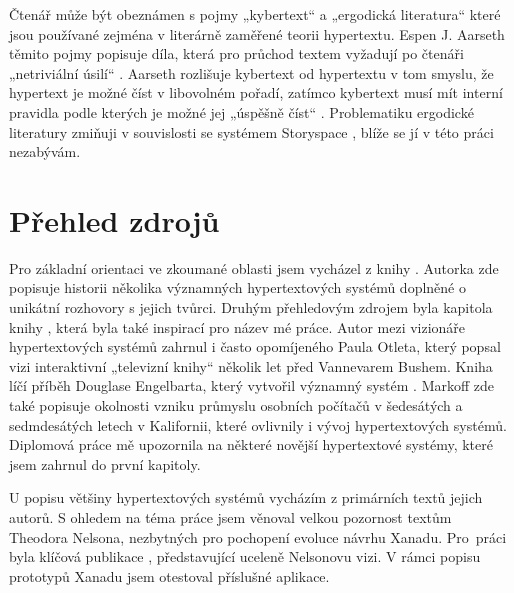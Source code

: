
Čtenář může být obeznámen s pojmy „kybertext“ a „ergodická literatura“ které jsou používané zejména v literárně zaměřené teorii hypertextu. Espen J. Aarseth těmito pojmy popisuje díla, která pro průchod textem vyžadují po čtenáři „netriviální úsilí“ \autocite[1]{Aarseth1997}. Aarseth rozlišuje kybertext od hypertextu v tom smyslu, že hypertext je možné číst v libovolném pořadí, zatímco kybertext musí mít interní pravidla podle kterých je možné jej „úspěšně číst“ \autocite{csmt:hypermedia}. Problematiku ergodické literatury zmiňuji v souvislosti se systémem Storyspace , blíže se jí v této práci nezabývám.

\section{Přehled zdrojů}

Pro základní orientaci ve zkoumané oblasti jsem vycházel z knihy  \autocite{Barnet2014}. Autorka zde popisuje historii několika významných hypertextových systémů doplněné o unikátní rozhovory s jejich tvůrci. Druhým přehledovým zdrojem byla kapitola  knihy  \autocite[183--229]{Glut}, která byla také inspirací pro název mé práce. Autor mezi vizionáře hypertextových systémů zahrnul i často opomíjeného Paula Otleta, který popsal vizi interaktivní „televizní knihy“ několik let před Vannevarem Bushem. Kniha  \autocite{Markoff2005} líčí příběh Douglase Engelbarta, který vytvořil významný systém . Markoff zde také popisuje okolnosti vzniku průmyslu osobních počítačů v šedesátých a sedmdesátých letech v Kalifornii, které ovlivnily i vývoj hypertextových systémů. Diplomová práce  \autocite{Muller-Prove2002} mě upozornila na některé novější hypertextové systémy, které jsem zahrnul do první kapitoly.

U popisu většiny hypertextových systémů vycházím z primárních textů jejich autorů. S ohledem na téma práce jsem věnoval velkou pozornost textům Theodora Nelsona, nezbytných pro pochopení evoluce návrhu Xanadu. Pro~práci byla klíčová publikace  \autocite{LitMachines}, představující uceleně Nelsonovu vizi.
V rámci popisu prototypů Xanadu jsem otestoval příslušné aplikace. 


